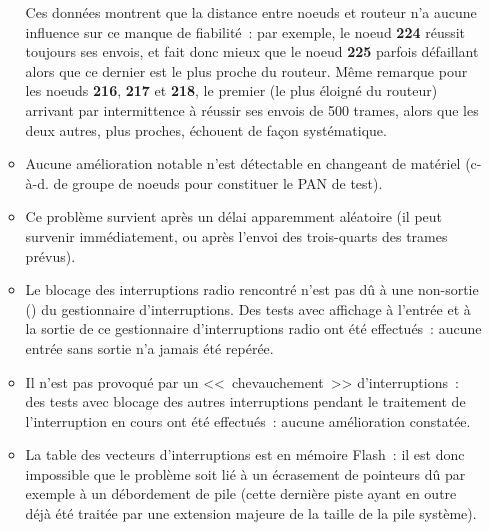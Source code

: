 \begin{itemize}
\begin{itemize}
  Ces données montrent que la distance entre noeuds et routeur n'a aucune
  influence sur ce manque de fiabilité~: par exemple, le noeud \textbf{224}
  réussit toujours ses envois, et fait donc mieux que le noeud \textbf{225}
  parfois défaillant alors que ce dernier est le plus proche du routeur.
  Même remarque pour les noeuds \textbf{216}, \textbf{217} et \textbf{218},
  le premier (le plus éloigné du routeur) arrivant par intermittence
  à réussir ses envois de 500 trames, alors que les deux autres,
  plus proches, échouent de façon systématique.

  \item Aucune amélioration notable n'est détectable en changeant de
  matériel (c-à-d. de groupe de noeuds pour constituer le PAN de test).

  \item Ce problème survient après un délai apparemment aléatoire
  (il peut survenir immédiatement, ou après l'envoi des trois-quarts
  des trames prévus).

  \item Le blocage des interruptions radio rencontré n'est pas dû à
  une non-sortie () du gestionnaire d'interruptions.
  Des tests avec affichage à l'entrée et à la sortie de ce gestionnaire
  d'interruptions radio ont été effectués~: aucune entrée sans sortie
  n'a jamais été repérée.

  \item Il n'est pas provoqué par un <<~chevauchement~>> d'interruptions~:
  des tests avec blocage des autres interruptions pendant le traitement
  de l'interruption en cours ont été effectués~: aucune amélioration
  constatée.

  \item La table des vecteurs d'interruptions est en mémoire Flash~:
  il est donc impossible que le problème soit lié à un écrasement de
  pointeurs dû par exemple à un débordement de pile (cette dernière piste
  ayant en outre déjà été traitée par une extension majeure de la taille
  de la pile système).


\end{itemize}
\end{itemize}
